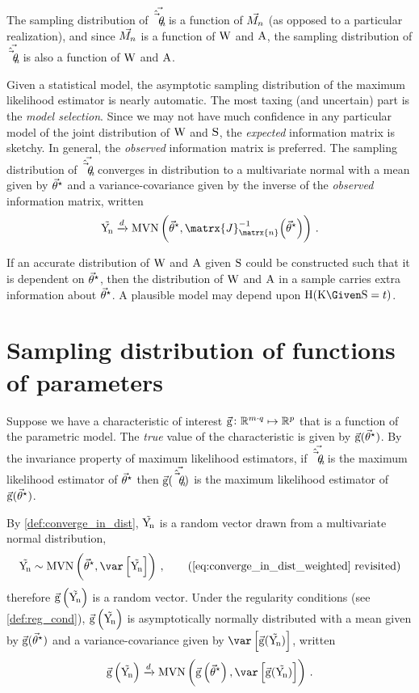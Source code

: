 \documentclass[../main.tex]{subfiles}
\begin{document}
The sampling distribution of $\vec{\hat{\vec{\theta}}_{n}}$ is a function of $\vec{M_n}$ (as opposed to a particular realization), and since $\vec{M_n}$ is a function of $\mathrm{W}$ and $\mathrm{A}$, the sampling distribution of $\vec{\hat{\vec{\theta}}_{n}}$ is also a function of $\mathrm{W}$ and $\mathrm{A}$.

Given a statistical model, the asymptotic sampling distribution of the maximum likelihood estimator is nearly automatic. The most taxing (and uncertain) part is the \emph{model selection}. Since we may not have much confidence in any particular model of the joint distribution of $\mathrm{W}$ and $\mathrm{S}$, the \emph{expected} information matrix is sketchy. In general, the \emph{observed} information matrix is preferred. The sampling distribution of $\vec{\hat{\vec{\theta}}_{n}}$ converges in distribution to a multivariate normal with a mean given by ${\vec{\theta}}^{\star}$ and a variance-covariance given by the inverse of the \emph{observed} information matrix, written
\begin{equation}
    \sampdu \xrightarrow{d} \mvn\left(\tparam\sysparamvec, \matrx{J}_{\matrx{n}}^{-1}\!\left(\tparam\sysparamvec\right)\right)\,.
\end{equation}

If an accurate distribution of $\mathrm{W}$ and $\mathrm{A}$ given $\mathrm{S}$ could be constructed such that it is dependent on ${\vec{\theta}}^{\star}$, then the distribution of $\mathrm{W}$ and $\mathrm{A}$ in a sample carries extra information about ${\vec{\theta}}^{\star}$.
A plausible model may depend upon $\entropy(\RV{K} \Given \sv = t)$.

\chapter{Sampling distribution of functions of parameters}
\label{sec:app}
Suppose we have a characteristic of interest $\vec{\operatorname{g}} \colon \mathbb{R}^{m \cdot q} \mapsto \mathbb{R}^{p}$ that is a function of the parametric model.
The \emph{true} value of the characteristic is given by $\vec{\operatorname{g}}({\vec{\theta}}^{\star})$.
By the invariance property of maximum likelihood estimators, if $\vec{\hat{\vec{\theta}}_{n}}$ is the maximum likelihood estimator of ${\vec{\theta}}^{\star}$ then $\vec{\operatorname{g}}(\vec{\hat{\vec{\theta}}_{n}})$ is the maximum likelihood estimator of $\vec{\operatorname{g}}({\vec{\theta}}^{\star})$.

By \cref{def:converge_in_dist}, $\mathrm{\vec{Y_{\!n}}}$ is a random vector drawn from a multivariate normal distribution,
\begin{equation*}
\sampdu \sim \mvn\left(\tparam\sysparamvec, \var\left[\sampdu\right]\right)\,,
\tag{\text{\ref{eq:converge_in_dist_weighted} revisited}}
\end{equation*}
therefore $\vec{\operatorname{g}}\left(\mathrm{\vec{Y_{\!n}}}\right)$ is a random vector. Under the regularity conditions (see \cref{def:reg_cond}), $\vec{\operatorname{g}}\left(\mathrm{\vec{Y_{\!n}}}\right)$ is asymptotically normally distributed with a mean given by $\vec{\operatorname{g}}({\vec{\theta}}^{\star})$ and a variance-covariance given by $\var\left[\vecstat(\sampdu)\right]$, written
\begin{equation}
\vecstat\left(\sampdu\right) \xrightarrow{d} \mvn\left(\vecstat\left(\tparam\sysparamvec\right), \var\left[\vecstat(\sampdu)\right]\right)\,.
\end{equation}
\end{document}
